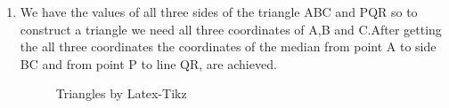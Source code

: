 \begin{enumerate}[label=\thesection.\arabic*.,ref=\thesection.\theenumi]
\item We have the values of all three sides of the triangle ABC and PQR so to construct  a triangle we need all three coordinates of A,B and C.After getting the all three coordinates the coordinates of the median from point A to side BC and from point P to line QR, are achieved.


\begin{figure}[!ht]
\centering
\resizebox{\columnwidth}{!}{}
\caption{ Triangles by Latex-Tikz}
\label{fig:con_triangles}	
\end{figure}
%
%
%


%
\begin{table}[ht!]
\centering

\caption{To construct $\triangle ACB$ and $\triangle PQR$}
\label{table:table1}	
\end{table}


\end{enumerate}
